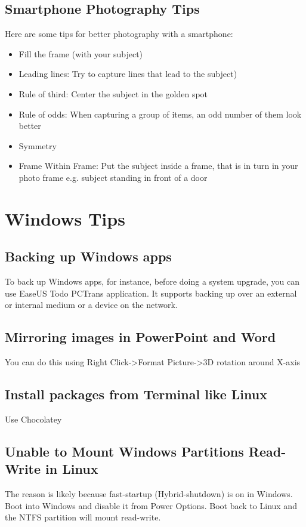 \documentclass{article}
\begin{document}
\subsection{Smartphone Photography Tips}
Here are some tips for better photography with a smartphone:
\begin{itemize}
	\item Fill the frame (with your subject)
	\item Leading lines: Try to capture lines that lead to the subject)
	\item Rule of third: Center the subject in the golden spot
	\item Rule of odds: When capturing a group of items, an odd number of them look better
	\item Symmetry
	\item Frame Within Frame: Put the subject inside a frame, that is in turn in your photo frame e.g. subject standing in front of a door
\end{itemize}

\section{Windows Tips}
  \subsection{Backing up Windows apps}
  To back up Windows apps, for instance, before doing a system upgrade, you can use EaseUS Todo PCTrans application. It supports backing up over an external or internal medium or a device on the network.
  \subsection{Mirroring images in PowerPoint and Word}
     You can do this using Right Click->Format Picture->3D rotation around X-axis
  \subsection{Install packages from Terminal like Linux}
  Use Chocolatey
  \subsection{Unable to Mount Windows Partitions Read-Write in Linux}
    The reason is likely because fast-startup (Hybrid-shutdown) is on in Windows. 
    Boot into Windows and disable it from Power Options. Boot back to Linux and the NTFS partition will mount read-write. 
\end{document}
